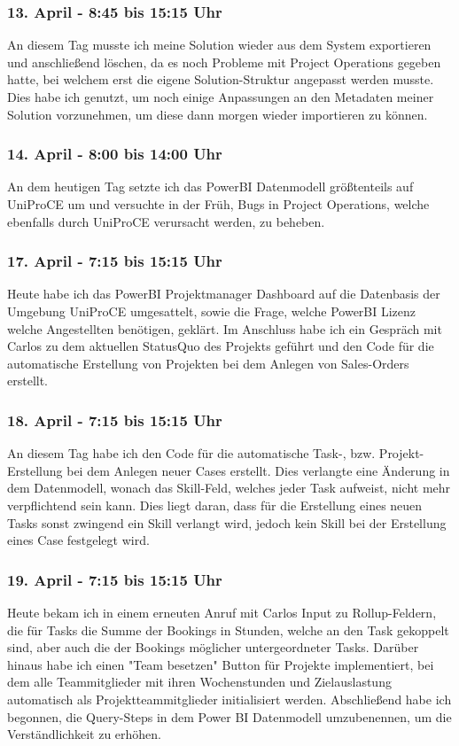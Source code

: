 \subsubsection*{13. April - 8:45 bis 15:15 Uhr}
An diesem Tag musste ich meine Solution wieder aus dem System exportieren und anschließend löschen, da es noch Probleme mit Project Operations gegeben hatte, bei welchem erst die eigene Solution-Struktur angepasst werden musste. Dies habe ich genutzt, um noch einige Anpassungen an den Metadaten meiner Solution vorzunehmen, um diese dann morgen wieder importieren zu können.

\subsubsection*{14. April - 8:00 bis 14:00 Uhr}
An dem heutigen Tag setzte ich das PowerBI Datenmodell größtenteils auf UniProCE um und versuchte in der Früh, Bugs in Project Operations, welche ebenfalls durch UniProCE verursacht werden, zu beheben.

\subsubsection*{17. April - 7:15 bis 15:15 Uhr}
Heute habe ich das PowerBI Projektmanager Dashboard auf die Datenbasis der Umgebung UniProCE umgesattelt, sowie die Frage, welche PowerBI Lizenz welche Angestellten benötigen, geklärt. Im Anschluss habe ich ein Gespräch mit Carlos zu dem aktuellen StatusQuo des Projekts geführt und den Code für die automatische Erstellung von Projekten bei dem Anlegen von Sales-Orders erstellt.

\subsubsection*{18. April - 7:15 bis 15:15 Uhr}
An diesem Tag habe ich den Code für die automatische Task-, bzw. Projekt-Erstellung bei dem Anlegen neuer Cases erstellt. Dies verlangte eine Änderung in dem Datenmodell, wonach das Skill-Feld, welches jeder Task aufweist, nicht mehr verpflichtend sein kann. Dies liegt daran, dass für die Erstellung eines neuen Tasks sonst zwingend ein Skill verlangt wird, jedoch kein Skill bei der Erstellung eines Case festgelegt wird.

\subsubsection*{19. April - 7:15 bis 15:15 Uhr}
Heute bekam ich in einem erneuten Anruf mit Carlos Input zu Rollup-Feldern, die für Tasks die Summe der Bookings in Stunden, welche an den Task gekoppelt sind, aber auch die der Bookings möglicher untergeordneter Tasks. Darüber hinaus habe ich einen "Team besetzen" Button für Projekte implementiert, bei dem alle Teammitglieder mit ihren Wochenstunden und Zielauslastung automatisch als Projektteammitglieder initialisiert werden. Abschließend habe ich begonnen, die Query-Steps in dem Power BI Datenmodell umzubenennen, um die Verständlichkeit zu erhöhen.

